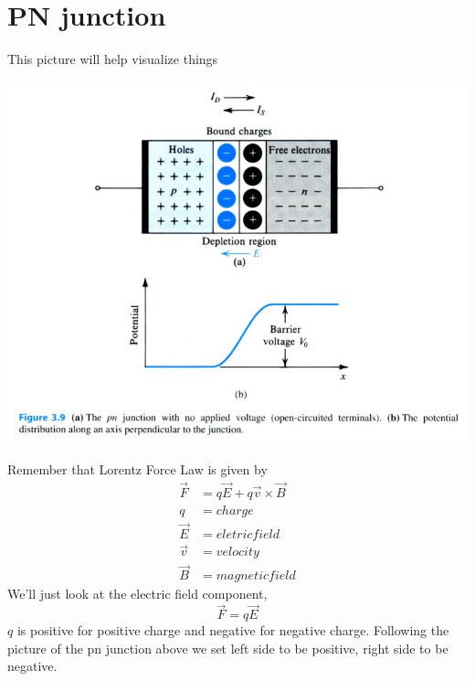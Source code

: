 \documentclass{article}
\begin{document}
	\section{PN junction}
		This picture will help visualize things
		\begin{center}
			\includegraphics[width=\textwidth]{img/pn_junction_equilibrium.png}
		\end{center}
		Remember that Lorentz Force Law is given by
		\begin{align*}
			\vec{F}&=q\vec{E}+q\vec{v}\times\vec{B}\\
			q&=charge\\
			\vec{E}&=eletric field\\
			\vec{v}&=velocity\\
			\vec{B}&=magnetic field
		\end{align*}
		We'll just look at the electric field component, \[\vec{F}=q\vec{E}\]$q$ is positive for positive charge and negative for negative charge. Following the picture of the pn junction above we set left side to be positive, right side to be negative.
\end{document}
